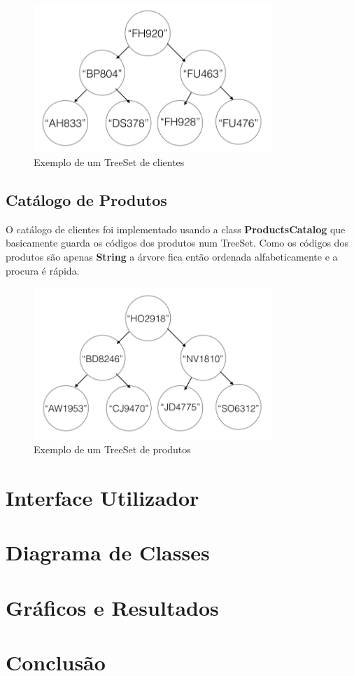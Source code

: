 \documentclass[10pt] {article}
\begin{document}
\begin{figure}[ht!]
\centering
\includegraphics[width=90mm]{catclientes.png}
\caption{Exemplo de um TreeSet de clientes}
\end{figure}

\newpage
\subsection{Catálogo de Produtos}
\par O catálogo de clientes foi implementado usando a class  \textbf{ProductsCatalog} que basicamente guarda os códigos 
dos produtos num TreeSet. Como os códigos dos produtos são apenas \textbf{String} a árvore fica então ordenada 
alfabeticamente e a procura é rápida.

\begin{figure}[ht!]
\centering
\includegraphics[width=90mm]{catprodutos.png}
\caption{Exemplo de um TreeSet de produtos}
\label{fig:catprodutos}
\end{figure}

\newpage
\section{Interface Utilizador}

\newpage
\section{Diagrama de Classes}

\newpage
\section{Gráficos e Resultados}

\newpage
\section{Conclusão}
\end{document}
